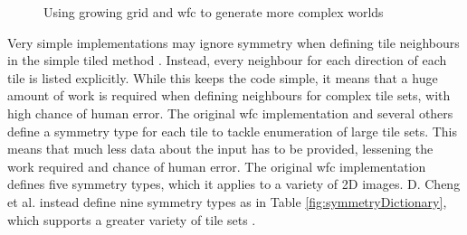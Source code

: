 \begin{figure}[H]
    \centering
    \hfill
    \caption{Using growing grid and \acrshort{wfc} to generate more complex worlds \cite{WFC_Neural_Network}}
    \label{fig:growingGrid}
\end{figure}

Very simple implementations may ignore symmetry when defining tile neighbours in the simple tiled method \cite{Easy_WFC}. Instead, every neighbour for each direction of each tile is listed explicitly. While this keeps the code simple, it means that a huge amount of work is required when defining neighbours for complex tile sets, with high chance of human error. The original \acrshort{wfc} implementation and several others define a symmetry type for each tile to tackle enumeration of large tile sets. This means that much less data about the input has to be provided, lessening the work required and chance of human error. The original \acrshort{wfc} implementation defines five symmetry types, which it applies to a variety of 2D images. D. Cheng et al. instead define nine symmetry types as in Table \ref{fig:symmetryDictionary}, which supports a greater variety of tile sets \cite{WFC_Automatic_Rules_And_Better_Symmetries}.

